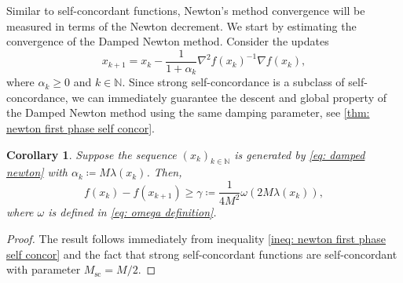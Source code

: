 \documentclass[sn-mathphys-num]{sn-jnl}%
\newcommand{\N}{\mathbb{N}}
\theoremstyle{thmstyleone}%
\newtheorem{corollary}{Corollary}[section]
\theoremstyle{thmstyletwo}%
\theoremstyle{thmstylethree}%
\numberwithin{equation}{section}
\begin{document}
Similar to self-concordant functions, Newton's method convergence will be measured in terms of the Newton decrement. We start by estimating the convergence of the Damped Newton method. Consider the updates
\begin{equation} \label{eq: damped newton}
    x_{k+1} = x_k - \frac{1}{1 + \alpha_k} \nabla^2 f (x_k)^{-1} \nabla f (x_k),
\end{equation}
where $\alpha_k \geq 0$ and $k \in \N$. Since strong self-concordance is a subclass of self-concordance, we can immediately guarantee the descent and global property of the Damped Newton method using the same damping parameter, see \cref{thm: newton first phase self concor}. 
\begin{corollary} \label{cor: damped newton convergence}
    Suppose the sequence $(x_k)_{k \in \N}$ is generated by \eqref{eq: damped newton} with $\alpha_k \coloneq M\lambda(x_k)$. Then,
    \begin{equation*}
         f(x_{k}) - f(x_{k+1}) \geq \gamma \coloneq \frac{1}{4M^2} \omega(2M \lambda(x_k)),
    \end{equation*}
    where $\omega$ is defined in \eqref{eq: omega definition}.
\end{corollary}
 \begin{proof}
     The result follows immediately from inequality \eqref{ineq: newton first phase self concor} and the fact that strong self-concordant functions are self-concordant with parameter $M_\text{sc} = M/2$.
 \end{proof}
\end{document}
